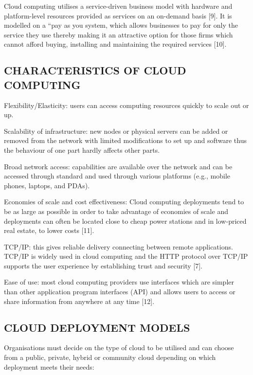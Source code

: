 \documentclass[10pt,journal,compsoc]{IEEEtran}
\begin{document}
\vspace{2mm}
Cloud computing utilises a service-driven business model with hardware and platform-level resources provided as services on an on-demand basis [9]. It is modelled on a “pay as you system, which allows businesses to pay for only the service they use thereby making it an attractive option for those firms which cannot afford buying, installing and maintaining the required services [10]. 


\subsection{CHARACTERISTICS OF CLOUD COMPUTING} 
\vspace{2mm}
Flexibility/Elasticity: users can access computing resources quickly to scale out or up. 

\vspace{2mm
}Scalability of infrastructure: new nodes or physical servers can be added or removed from the network with limited 	modifications to set up and software thus the behaviour of one part hardly affects other parts.

\vspace{2mm}
Broad network access: capabilities are available over the network and can be accessed through standard and used through various platforms (e.g., mobile phones, laptops, and PDAs). 

\vspace{2mm}
Economies of scale and cost effectiveness: Cloud computing deployments tend to be as large as possible in order to take advantage of economies of scale and deployments can often be located close to cheap power stations and in low-priced real 	   estate, to lower costs [11]. 

\vspace{2mm}
TCP/IP: this gives reliable delivery connecting between remote applications. TCP/IP is widely used in cloud computing and the HTTP protocol over TCP/IP supports the user experience by establishing trust and security [7].

\vspace{2mm}
Ease of use: most cloud computing providers use interfaces which are simpler than other application program interfaces (API) and allows users to access or share information from anywhere at any time [12]. 


\subsection{CLOUD DEPLOYMENT MODELS}
\vspace{2mm}
Organisations must decide on the type of cloud to be utilised and can choose from a public, private, hybrid or community cloud depending on which deployment meets their needs:
\end{document}
